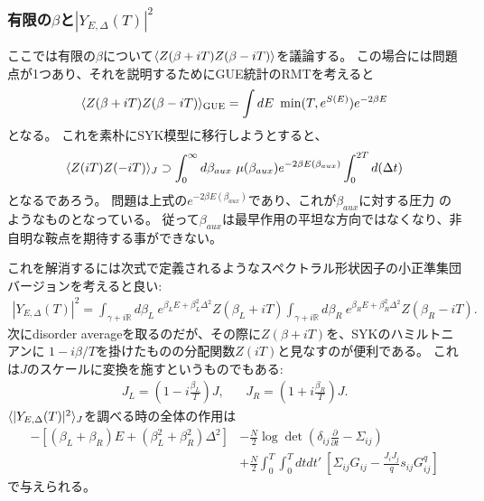 \subsubsection{有限の$\beta$と$|Y_{E,\Delta}(T)|^2$}
ここでは有限の$\beta$について$\langle Z(\beta + iT)Z(\beta - iT) \rangle$を議論する。
この場合には問題点が1つあり、それを説明するためにGUE統計のRMTを考えると
\begin{align}
	\langle Z(\beta + iT)Z(\beta - iT) \rangle_{\mathrm{GUE}}
	=\int dE\ \min(T, e^{S(E)})e^{-2\beta E}
\end{align}
となる。
これを素朴にSYK模型に移行しようとすると、
\begin{align}
	\langle Z(iT)Z(-iT) \rangle_J \supset
	\int_0^{\infty}d\beta_{aux}\ \mu(\beta_{aux})e^{-2\beta E(\beta_{aux})}
	\int_0^{2T} d(\Delta t)
\end{align}
となるであろう。
問題は上式の$e^{-2\beta E(\beta_{aux})}$であり、これが$\beta_{aux}$に対する圧力
のようなものとなっている。
従って$\beta_{aux}$は最早作用の平坦な方向ではなくなり、非自明な鞍点を期待する事ができない。

これを解消するには次式で定義されるようなスペクトラル形状因子の小正準集団バージョンを考えると良い:
\begin{align}
	|Y_{E, \Delta}(T)|^2
	= \int_{\gamma + i\mathbb{R}}d\beta_L\ e^{\beta_LE + \beta_L^2\Delta^2}Z(\beta_L + iT)
	\int_{\gamma + i\mathbb{R}}d\beta_R\ e^{\beta_RE + \beta_R^2\Delta^2}Z(\beta_R - iT).
\end{align}
次にdisorder averageを取るのだが、その際に$Z(\beta + iT)$を、SYKのハミルトニアンに
$1 - i\beta / T$を掛けたものの分配関数$Z(iT)$と見なすのが便利である。
これは$J$のスケールに変換を施すというものでもある:
\begin{align}
	J_L = \left(1 - i\frac{\beta_L}{T}\right)J,\hspace{20pt}
	J_R = \left(1 + i\frac{\beta_R}{T}\right)J.
\end{align}
$\langle |Y_{E,\Delta}(T)|^2 \rangle_J$を調べる時の全体の作用は
\begin{align}
	-\left[(\beta_L + \beta_R)E + (\beta_L^2 + \beta_R^2)\Delta^2\right]
	&-\frac{N}{2}\log\det\left(\delta_{ij}\frac{\partial}{\partial t}
	- \Sigma_{ij}\right)\nonumber\\
	&+\frac{N}{2}\int_0^T\int_0^T dtdt'\ 
		\left[\Sigma_{ij}G_{ij} - \frac{J_iJ_j}{q}s_{ij}G_{ij}^q\right]
\end{align}
で与えられる。

\pagebreak
